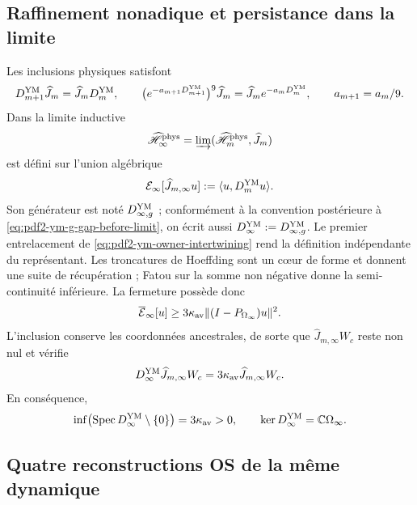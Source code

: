 \subsection{Raffinement nonadique et persistance dans la limite}

Les inclusions physiques satisfont
\begin{equation}\label{eq:pdf2-ym-owner-intertwining}
 D_{m+1}^{\rm YM}\widehat J_m
 =\widehat J_mD_m^{\rm YM},\qquad
 \bigl(e^{-a_{m+1}D_{m+1}^{\rm YM}}\bigr)^9\widehat J_m
 =\widehat J_me^{-a_mD_m^{\rm YM}},\qquad a_{m+1}=a_m/9.
\end{equation}
Dans la limite inductive
\begin{equation}\label{eq:pdf2-ym-owner-inductive-limit}
 \widehat{\mathscr H}_\infty^{\rm phys}
 =\varinjlim(\widehat{\mathscr H}_m^{\rm phys},\widehat J_m)
\end{equation}
est défini sur l’union algébrique
\begin{equation}\label{eq:pdf2-ym-owner-limit-form}
 \mathcal E_\infty[\widehat J_{m,\infty}u]
 :=\langle u,D_m^{\rm YM}u\rangle.
\end{equation}
Son générateur est noté
$D_{\infty,g}^{\rm YM}$ ; conformément à la convention postérieure à
\eqref{eq:pdf2-ym-g-gap-before-limit}, on écrit aussi
$D_\infty^{\rm YM}:=D_{\infty,g}^{\rm YM}$.
Le premier entrelacement de \eqref{eq:pdf2-ym-owner-intertwining} rend la
définition indépendante du représentant. Les troncatures de Hoeffding sont
un cœur de forme et donnent une suite de récupération ; Fatou sur la somme non négative
donne la semi-continuité inférieure. La fermeture possède donc
\begin{equation}\label{eq:pdf2-ym-owner-limit-gap}
 \overline{\mathcal E}_\infty[u]
 \ge3\kappa_{\rm av}\|(I-P_{\Omega_\infty})u\|^2.
\end{equation}
L’inclusion conserve les coordonnées ancestrales, de sorte que
$\widehat J_{m,\infty}W_c$ reste non nul et vérifie
\begin{equation}\label{eq:pdf2-ym-owner-limit-witness}
 D_\infty^{\rm YM}\widehat J_{m,\infty}W_c
 =3\kappa_{\rm av}\widehat J_{m,\infty}W_c.
\end{equation}
En conséquence,
\begin{equation}\label{eq:pdf2-ym-owner-exact-gap}
 \inf\bigl(\operatorname{Spec}D_\infty^{\rm YM}\setminus\{0\}\bigr)
 =3\kappa_{\rm av}>0,
 \qquad \ker D_\infty^{\rm YM}=\mathbb C\Omega_\infty.
\end{equation}

\subsection{Quatre reconstructions OS de la même dynamique}

